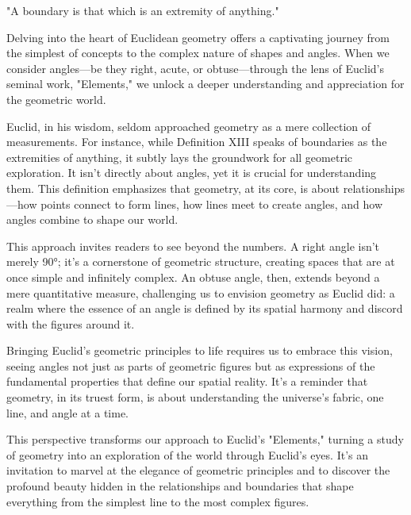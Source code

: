 
\begin{defin}
"A boundary is that which is an extremity of anything."
\end{defin}

Delving into the heart of Euclidean geometry offers a captivating journey from the simplest of concepts to the complex nature of shapes and angles. When we consider angles—be they right, acute, or obtuse—through the lens of Euclid's seminal work, "Elements," we unlock a deeper understanding and appreciation for the geometric world.

Euclid, in his wisdom, seldom approached geometry as a mere collection of measurements. For instance, while Definition XIII speaks of boundaries as the extremities of anything, it subtly lays the groundwork for all geometric exploration. It isn't directly about angles, yet it is crucial for understanding them. This definition emphasizes that geometry, at its core, is about relationships—how points connect to form lines, how lines meet to create angles, and how angles combine to shape our world.

This approach invites readers to see beyond the numbers. A right angle isn't merely \ang{90}; it's a cornerstone of geometric structure, creating spaces that are at once simple and infinitely complex. An obtuse angle, then, extends beyond a mere quantitative measure, challenging us to envision geometry as Euclid did: a realm where the essence of an angle is defined by its spatial harmony and discord with the figures around it.

Bringing Euclid's geometric principles to life requires us to embrace this vision, seeing angles not just as parts of geometric figures but as expressions of the fundamental properties that define our spatial reality. It's a reminder that geometry, in its truest form, is about understanding the universe’s fabric, one line, and angle at a time.

\clearpage

This perspective transforms our approach to Euclid’s "Elements," turning a study of geometry into an exploration of the world through Euclid's eyes. It’s an invitation to marvel at the elegance of geometric principles and to discover the profound beauty hidden in the relationships and boundaries that shape everything from the simplest line to the most complex figures.

\clearpage